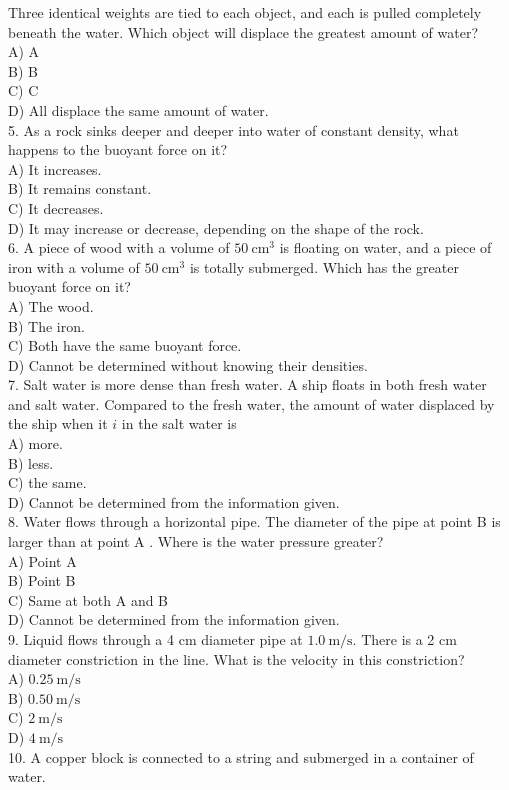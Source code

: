 \begin{enumerate}
Three identical weights are tied to each object, and each is pulled completely beneath the water. Which object will displace the greatest amount of water?\\
A) A\\
B) B\\
C) C\\
D) All displace the same amount of water.\\
5. As a rock sinks deeper and deeper into water of constant density, what happens to the buoyant force on it?\\
A) It increases.\\
B) It remains constant.\\
C) It decreases.\\
D) It may increase or decrease, depending on the shape of the rock.\\
6. A piece of wood with a volume of $50 \mathrm{~cm}^{3}$ is floating on water, and a piece of iron with a volume of $50 \mathrm{~cm}^{3}$ is totally submerged. Which has the greater buoyant force on it?\\
A) The wood.\\
B) The iron.\\
C) Both have the same buoyant force.\\
D) Cannot be determined without knowing their densities.\\
7. Salt water is more dense than fresh water. A ship floats in both fresh water and salt water. Compared to the fresh water, the amount of water displaced by the ship when it $i$ in the salt water is\\
A) more.\\
B) less.\\
C) the same.\\
D) Cannot be determined from the information given.\\
8. Water flows through a horizontal pipe. The diameter of the pipe at point B is larger than at point A . Where is the water pressure greater?\\
A) Point A\\
B) Point B\\
C) Same at both A and B\\
D) Cannot be determined from the information given.\\
9. Liquid flows through a 4 cm diameter pipe at $1.0 \mathrm{~m} / \mathrm{s}$. There is a 2 cm diameter constriction in the line. What is the velocity in this constriction?\\
A) $0.25 \mathrm{~m} / \mathrm{s}$\\
B) $0.50 \mathrm{~m} / \mathrm{s}$\\
C) $2 \mathrm{~m} / \mathrm{s}$\\
D) $4 \mathrm{~m} / \mathrm{s}$\\
10. A copper block is connected to a string and submerged in a container of water.


\end{enumerate}
